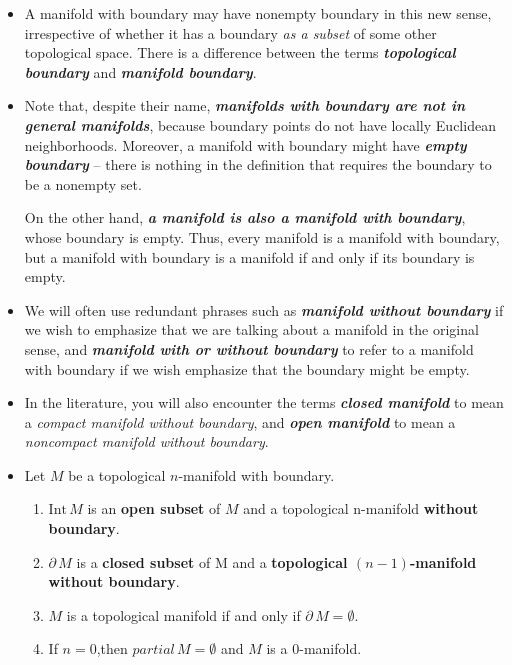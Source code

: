 \documentclass[11pt]{article}
\begin{document}
\begin{itemize}
\item A manifold with boundary may have nonempty boundary in this new sense, irrespective of whether it has a boundary \emph{as a subset }of some other topological space. There is a difference between the terms \emph{\textbf{topological boundary}} and \emph{\textbf{manifold boundary}}.

\item Note that, despite their name, \emph{\textbf{manifolds with boundary are not in general manifolds}}, because boundary points do not have locally Euclidean neighborhoods. Moreover, a manifold with boundary might have \emph{\textbf{empty boundary}} -- there is nothing in the definition that requires the boundary to be a nonempty set. 

On the other hand, \emph{\textbf{a manifold is also a manifold with boundary}}, whose boundary is empty. Thus, every manifold is a manifold with boundary, but a manifold with boundary is a manifold if and only if its boundary is empty.

\item We will often use redundant phrases such as \emph{\textbf{manifold without boundary}} if we wish to emphasize that we are talking about a manifold in the original sense, and \emph{\textbf{manifold with or without boundary}} to refer to a manifold with boundary if we wish emphasize that the boundary might be empty.

\item In the literature, you will also encounter the terms \emph{\textbf{closed manifold}} to mean a \emph{compact manifold without boundary}, and \emph{\textbf{open manifold}} to mean a \emph{noncompact manifold without boundary}.

\item \begin{proposition}
Let $M$ be a topological $n$-manifold with boundary.
\begin{enumerate}
\item $\text{Int}\, M$ is an \textbf{open subset} of $M$ and a topological n-manifold \textbf{without boundary}.
\item $\partial\,M$ is a \textbf{closed subset} of M and a \textbf{topological $(n - 1)$-manifold without boundary}.
\item $M$ is a topological manifold if and only if $\partial\,M = \emptyset$.
\item If $n = 0$,then $partial\,M = \emptyset$ and $M$ is a $0$-manifold.
\end{enumerate}
\end{proposition}


\end{itemize}
\end{document}
